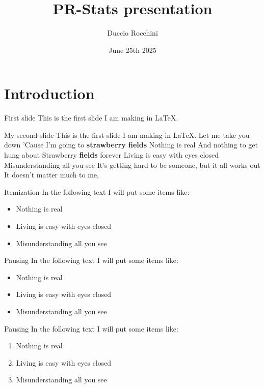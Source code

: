\documentclass{beamer}
\title{PR-Stats presentation}
\author{Duccio Rocchini}
\date{June 25th 2025}
\institute{Talk held at:\\
    \bigskip
    \centering
    \texttt{[image: esa.png]}
           }
\begin{document}
\maketitle


\section{Introduction}

\begin{frame}{First slide}
    This is the first slide I am making in LaTeX.
\end{frame}

\begin{frame}{My second slide}
    This is the first slide I am making in LaTeX. Let me take you down
'Cause I'm going to \textbf{strawberry fields}
Nothing is real
And nothing to get hung about
Strawberry \textbf{fields} forever
Living is easy with eyes closed
Misunderstanding all you see
It's getting hard to be someone, but it all works out
It doesn't matter much to me,
\end{frame}

\begin{frame}{Itemization}
    In the following text I will put some items like:
    \begin{itemize}
        \item Nothing is real
        \item Living is easy with eyes closed
        \item Misunderstanding all you see
    \end{itemize}
\end{frame}

\begin{frame}{Pausing}
    In the following text I will put some items like:
    \begin{itemize}
        \item Nothing is real
        \item \pause Living is easy with eyes closed
        \item \pause Misunderstanding all you see
    \end{itemize}
\end{frame}

\begin{frame}{Pausing}
    In the following text I will put some items like:
    \begin{enumerate}
        \item Nothing is real
        \item \pause Living is easy with eyes closed
        \item \pause Misunderstanding all you see
    \end{enumerate}
\end{frame}
\end{document}
